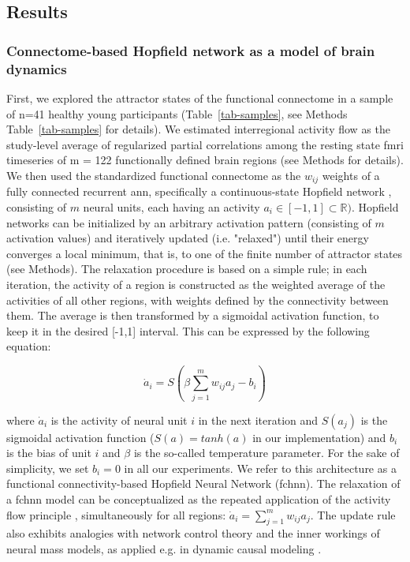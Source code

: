 \documentclass{article}
\begin{document}
\subsection{Results}

\subsubsection{Connectome-based Hopfield network as a model of brain dynamics}

First, we explored the attractor states of the functional connectome in a sample of n=41 healthy young
participants (Table~\ref{tab-samples}, see Methods Table~\ref{tab-samples} for details). We estimated interregional activity flow \citep{cole2016activity, ito2017cognitive}
as the study-level average of regularized partial correlations among the resting state \acrshort{fmri} timeseries of m = 122
functionally defined brain regions (see Methods for details). We then used the standardized
functional connectome as the $w_{ij}$  weights of a fully connected recurrent \acrshort{ann}, specifically a continuous-state Hopfield network \citep{hopfield1982neural, koiran1994dynamics}, consisting of $m$ neural units, each having an activity
$a_i \in [ -1,1] \subset \mathbb{R})$. Hopfield networks can be initialized by an arbitrary activation pattern (consisting of $m$ activation values) and iteratively updated (i.e. "relaxed") until their energy converges a local minimum, that is, to one of the finite number of attractor states (see Methods). The relaxation procedure is based on a simple rule; in each iteration, the activity of a region is constructed as the weighted average of the activities of all other regions, with weights defined by the connectivity between them. The average is then transformed by a sigmoidal activation function, to keep it in the desired [-1,1] interval.
This can be expressed by the following equation:

\begin{equation}
\label{hopfield-update}
\dot{a}_i = S(\beta \sum_{j=1}^m w_{ij}a_j - b_i)
\end{equation}

where $\dot{a}_i$ is the activity of neural unit $i$ in the next iteration and $S(a_j)$ is the sigmoidal activation
function ($S(a) = tanh(a)$ in our implementation) and $b_i$ is the bias of unit $i$ and $\beta$ is the so-called temperature parameter. For the sake of simplicity, we set $b_i=0$ in all our experiments. We refer to this architecture as a functional connectivity-based Hopfield Neural Network (\acrshort{fchnn}).
The relaxation of a \acrshort{fchnn} model can be conceptualized as the repeated application of the activity flow principle \citep{cole2016activity, ito2017cognitive} , simultaneously for all regions: $\dot{a}_i = \sum_{j=1}^m w_{ij}a_j$. The update rule also exhibits analogies with network control theory \citep{gu2015controllability} and the inner workings of neural mass models, as applied e.g. in dynamic causal modeling \citep{daunizeau2012stochastic}.
\end{document}
